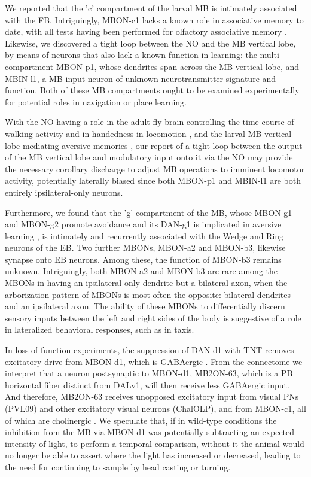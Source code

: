 We reported that the 'c' compartment of the larval MB is intimately associated with the FB. Intriguingly, MBON-c1 lacks a known role in associative memory to date, with all tests having been performed for olfactory associative memory \citep{eschbach2020recurrent}. Likewise, we discovered a tight loop between the NO and the MB vertical lobe, by means of neurons that also lack a known function in learning: the multi-compartment MBON-p1, whose dendrites span across the MB vertical lobe, and MBIN-l1, a MB input neuron of unknown neurotransmitter signature and function. Both of these MB compartments ought to be examined experimentally for potential roles in navigation or place learning.

With the NO having a role in the adult fly brain controlling the time course of walking activity \citep{strauss1993higher} and in handedness in locomotion \citep{buchanan2015neuronal}, and the larval MB vertical lobe mediating aversive memories \citep{eschbach2020recurrent}, our report of a tight loop between the output of the MB vertical lobe and modulatory input onto it via the NO may provide the necessary corollary discharge to adjust MB operations to imminent locomotor activity, potentially laterally biased since both MBON-p1 and MBIN-l1 are both entirely ipsilateral-only neurons.

Furthermore, we found that the 'g' compartment of the MB, whose MBON-g1 and MBON-g2 promote avoidance \citep{eschbach2021circuits} and its DAN-g1 is implicated in aversive learning \citep{eschbach2020recurrent}, is intimately and recurrently associated with the Wedge and Ring neurons of the EB. Two further MBONs, MBON-a2 and MBON-b3, likewise synapse onto EB neurons. Among these, the function of MBON-b3 remains unknown. Intriguingly, both MBON-a2 and MBON-b3 are rare among the MBONs in having an ipsilateral-only dendrite but a bilateral axon, when the arborization pattern of MBONs is most often the opposite: bilateral dendrites and an ipsilateral axon. The ability of these MBONs to differentially discern sensory inputs between the left and right sides of the body is suggestive of a role in lateralized behavioral responses, such as in taxis.

In loss-of-function experiments, the suppression of DAN-d1 with TNT removes excitatory drive from MBON-d1, which is GABAergic \citep{eschbach2021circuits}. From the connectome we interpret that a neuron postsynaptic to MBON-d1, MB2ON-63, which is a PB horizontal fiber distinct from DALv1, will then receive less GABAergic input. And therefore, MB2ON-63 receives unopposed excitatory input from visual PNs (PVL09) and other excitatory visual neurons (ChalOLP), and from MBON-c1, all of which are cholinergic \citep{larderet2017opticlobe, eschbach2021circuits}. We speculate that, if in wild-type conditions the inhibition from the MB via MBON-d1 was potentially subtracting an expected intensity of light, to perform a temporal comparison, without it the animal would no longer be able to assert where the light has increased or decreased, leading to the need for continuing to sample by head casting or turning.



